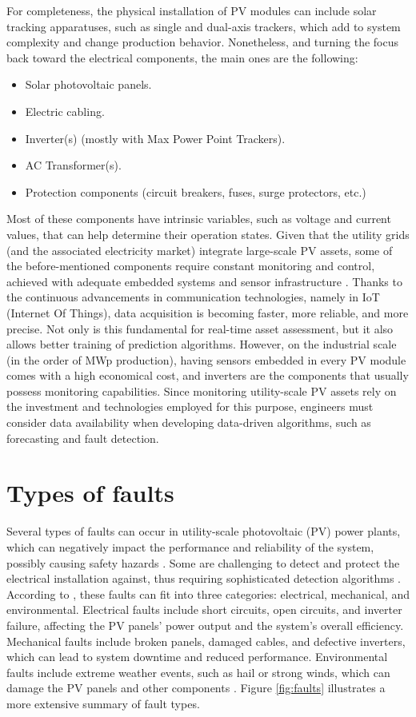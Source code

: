 For completeness, the physical installation of PV modules can include solar tracking apparatuses, such as single and dual-axis trackers, which add to system complexity and change production behavior. Nonetheless, and turning the focus back toward the electrical components, the main ones are the following:

\begin{itemize}
    \item Solar photovoltaic panels.
    \item Electric cabling.
    \item Inverter(s) (mostly with Max Power Point Trackers).
    \item AC Transformer(s).
    \item Protection components (circuit breakers, fuses, surge protectors,
    etc.)
\end{itemize}

Most of these components have intrinsic variables, such as voltage and current values, that can help determine their operation states. Given that the utility grids (and the associated electricity market) integrate large-scale PV assets, some of the before-mentioned components require constant monitoring and control, achieved with adequate embedded systems and sensor infrastructure \cite{AIPV}. Thanks to the continuous advancements in communication technologies, namely in IoT (Internet Of Things), data acquisition is becoming faster, more reliable, and more precise. Not only is this fundamental for real-time asset assessment, but it also allows better training of prediction algorithms. However, on the industrial scale (in the order of MWp production), having sensors embedded in every PV module comes with a high economical cost, and inverters are the components that usually possess monitoring capabilities. Since monitoring utility-scale PV assets rely on the investment and technologies employed for this purpose,  engineers must consider data availability when developing data-driven algorithms, such as forecasting and fault detection.

\section{Types of faults}

Several types of faults can occur in utility-scale photovoltaic (PV) power plants, which can negatively impact the performance and reliability of the system, possibly causing safety hazards \cite{Alam2015}. Some are challenging to detect and protect the electrical installation against, thus requiring sophisticated detection algorithms \cite{Pillai2018}. According to \cite{Pillai2018}, these faults can fit into three categories: electrical, mechanical, and environmental. Electrical faults include short circuits, open circuits, and inverter failure, affecting the PV panels' power output and the system's overall efficiency. Mechanical faults include broken panels, damaged cables, and defective inverters, which can lead to system downtime and reduced performance. Environmental faults include extreme weather events, such as hail or strong winds, which can damage the PV panels and other components \cite{faults}. Figure \ref{fig:faults} illustrates a more extensive summary of fault types.

